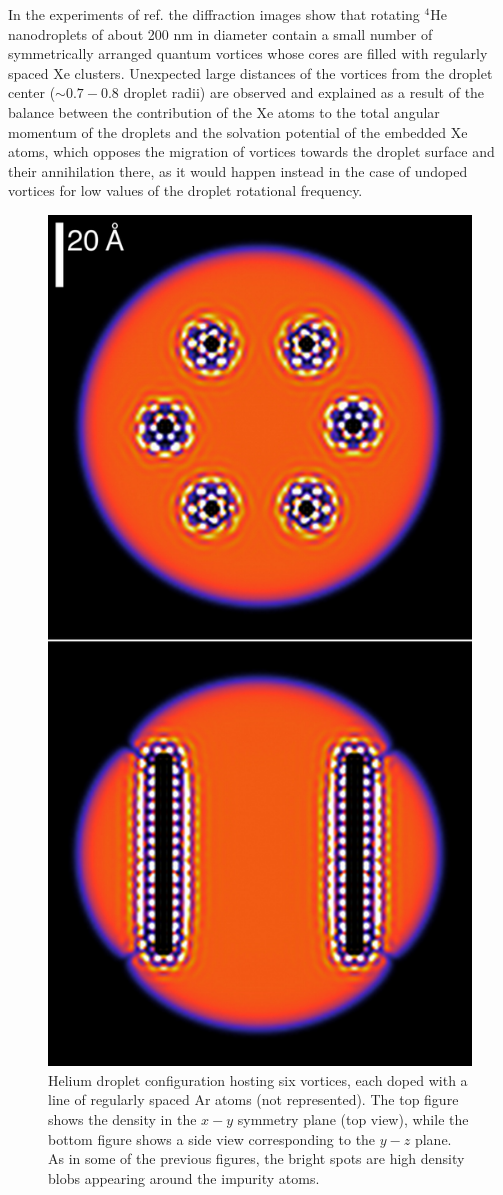 In the experiments of ref. \citep{Jon16} the diffraction images 
show that rotating $^4$He nanodroplets of about 200 nm in diameter 
contain a small number of symmetrically arranged quantum 
vortices whose cores are filled with regularly spaced 
Xe clusters. Unexpected large distances 
of the vortices from the droplet center ($\sim 0.7-0.8$ droplet radii) 
are observed and explained as a result of the balance between 
the contribution of the Xe atoms to the total angular momentum of the droplets and 
the solvation potential of the embedded Xe atoms, which opposes the migration of vortices
towards the droplet surface and their annihilation there, as it would
happen instead in the case of undoped vortices for low values of the
droplet rotational frequency.

\begin{figure}[!]
\centerline{\includegraphics[width=0.6\linewidth,clip]{fig13}}
\caption{\label{fig13-capture} 
Helium droplet configuration hosting six vortices, each doped with a line of 
regularly spaced Ar atoms (not represented). 
The top figure shows the density in the $x-y$
symmetry plane (top view), while the bottom figure shows a side view corresponding to the 
$y-z$ plane. 
As in some of the previous figures, the bright  spots are high density blobs appearing around the impurity atoms.
}
\end{figure}

